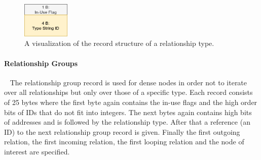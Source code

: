                 \begin{figure}[htp]\label{rel_type_record}
                    \begin{center}
                        \includegraphics[keepaspectratio,height=0.2\textheight,width=0.2\textwidth]{img/03_record/relationship/rel_type_record.png}
                    \end{center}
                    \caption{A visualization of the record structure of a relationship type.} %
                \end{figure}
                
            \paragraph{Relationship Groups}~\label{rel_group}
                The relationship group record is used for dense nodes in order not to iterate over all relationships but only over those of a specific type.
                Each record consists of 25 bytes where the first byte again contains the in-use flags and the high order bits of IDs that do not fit into integers.
                The next bytes again contains high bits of addresses and is followed by the relationship type.
                After that a reference (an ID) to the next relationship group record is given.
                Finally the first outgoing relation, the first incoming relation, the first looping relation and the node of interest are specified.
            

